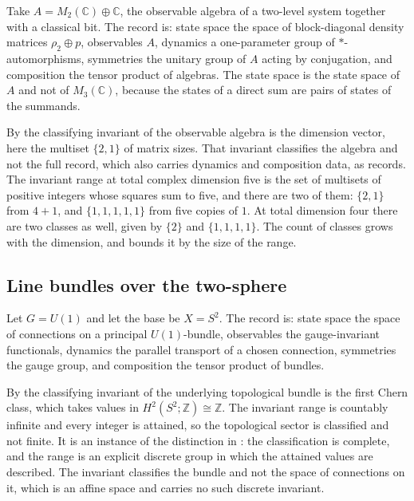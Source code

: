 \documentclass[11pt,letterpaper]{article}
\theoremstyle{definition}
\theoremstyle{remark}
\begin{document}
Take $A = M_2(\mathbb{C}) \oplus \mathbb{C}$, the observable algebra of a two-level system together with a classical bit. The record is: state space the space of block-diagonal density matrices $\rho_2 \oplus p$, observables $A$, dynamics a one-parameter group of $*$-automorphisms, symmetries the unitary group of $A$ acting by conjugation, and composition the tensor product of algebras. The state space is the state space of $A$ and not of $M_3(\mathbb{C})$, because the states of a direct sum are pairs of states of the summands.

By  the classifying invariant of the observable algebra is the dimension vector, here the multiset $\{2, 1\}$ of matrix sizes. That invariant classifies the algebra and not the full record, which also carries dynamics and composition data, as  records. The invariant range at total complex dimension five is the set of multisets of positive integers whose squares sum to five, and there are two of them: $\{2, 1\}$ from $4 + 1$, and $\{1, 1, 1, 1, 1\}$ from five copies of $1$. At total dimension four there are two classes as well, given by $\{2\}$ and $\{1, 1, 1, 1\}$. The count of classes grows with the dimension, and  bounds it by the size of the range.

\subsection{Line bundles over the two-sphere}
\label{sec:worked-bundle}

Let $G = U(1)$ and let the base be $X = S^2$. The record is: state space the space of connections on a principal $U(1)$-bundle, observables the gauge-invariant functionals, dynamics the parallel transport of a chosen connection, symmetries the gauge group, and composition the tensor product of bundles.

By  the classifying invariant of the underlying topological bundle is the first Chern class, which takes values in $H^2(S^2; \mathbb{Z}) \cong \mathbb{Z}$. The invariant range is countably infinite and every integer is attained, so the topological sector is classified and not finite. It is an instance of the distinction in : the classification is complete, and the range is an explicit discrete group in which the attained values are described. The invariant classifies the bundle and not the space of connections on it, which is an affine space and carries no such discrete invariant.
\end{document}
